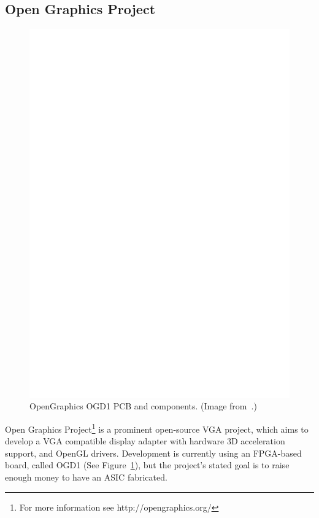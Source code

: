 \subsection{Open Graphics Project}

\begin{figure}[h!]
\begin{center}
\includegraphics[width=\linewidth]{images/ogd1_showcase.eps}
\end{center}
\caption[OpenGraphics OGD1]{OpenGraphics OGD1 PCB and components. (Image
from~\cite{OpenGraphics}.)}
\label{INTRO_OGD1}
\end{figure}

Open Graphics Project\footnote{For more information see http://opengraphics.org/}
is a prominent open-source VGA project, which aims to develop a VGA compatible
display adapter with hardware 3D acceleration support, and OpenGL drivers.
Development is currently using an FPGA-based board, called OGD1 (See
Figure~\ref{INTRO_OGD1}), but the project's stated goal is to raise enough money
to have an ASIC fabricated.


